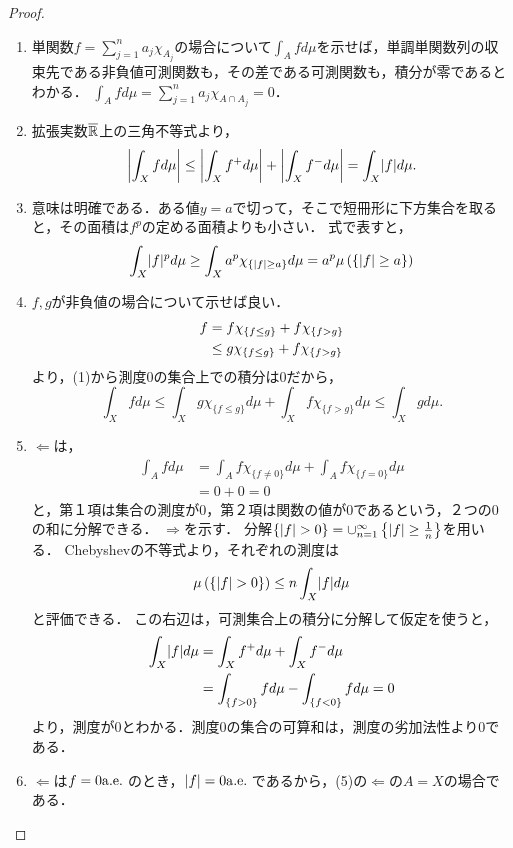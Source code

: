 \documentclass[uplatex, dvipdfmx]{jsreport}
\begin{document}
\begin{proof}\mbox{}
    \begin{enumerate}
        \item 単関数$f=\sum^n_{j=1}a_j\chi_{A_j}$の場合について$\int_Afd\mu$を示せば，単調単関数列の収束先である非負値可測関数も，その差である可測関数も，積分が零であるとわかる．
        $\int_Afd\mu=\sum^n_{j=1}a_j\chi_{A\cap A_j}=0$．
        \item 
        拡張実数$\overline{\mathbb{R}}$上の三角不等式より，
        \[\left|\int_Xfd\mu\right|\le\left|\int_Xf^+d\mu\right|+\left|\int_Xf^-d\mu\right|=\int_X\lvert f\rvert d\mu.\]
        \item 意味は明確である．ある値$y=a$で切って，そこで短冊形に下方集合を取ると，その面積は$f^p$の定める面積よりも小さい．
        式で表すと，
        \[\int_X\lvert f\rvert^pd\mu\ge\int_Xa^p\chi_{\{\lvert f\rvert\ge a\}}d\mu=a^p\mu\left(\left\{\lvert f\rvert\ge a\right\}\right)\]
        \item $f,g$が非負値の場合について示せば良い．
        \begin{align*}
            f&=f\chi_{\left\{f\le g\right\}}+f\chi_{\left\{f>g\right\}}\\
            &\le g\chi_{\left\{f\le g\right\}}+f\chi_{\left\{f>g\right\}}
        \end{align*}
        より，(1)から測度$0$の集合上での積分は$0$だから，
        \[\int_Xfd\mu\le\int_Xg\chi_{\{f\le g\}}d\mu+\int_Xf\chi_{\{f>g\}}d\mu\le\int_Xgd\mu.\]
        \item $\Leftarrow$は，
        \begin{align*}
            \int_Afd\mu&=\int_Af\chi_{\{f\ne 0\}}d\mu+\int_Af\chi_{\{f=0\}}d\mu\\
            &=0+0=0
        \end{align*}
        と，第１項は集合の測度が$0$，第２項は関数の値が$0$であるという，２つの$0$の和に分解できる．
        $\Rightarrow$を示す．
        分解$\left\{\lvert f\rvert>0\right\}=\cup^\infty_{n=1}\left\{\lvert f\rvert\ge\frac{1}{n}\right\}$を用いる．
        Chebyshevの不等式より，それぞれの測度は
        \[\mu\left(\left\{\lvert f\rvert>0\right\}\right)\le n\int_X\lvert f\rvert d\mu\]
        と評価できる．
        この右辺は，可測集合上の積分に分解して仮定を使うと，
        \begin{align*}
            \int_X\lvert f\rvert d\mu&=\int_Xf^+d\mu+\int_Xf^-d\mu\\
            &=\int_{\{f>0\}}fd\mu-\int_{\{f<0\}}fd\mu=0
        \end{align*}
        より，測度が$0$とわかる．測度$0$の集合の可算和は，測度の劣加法性より$0$である．
        \item 
        $\Leftarrow$は$f=0\mathrm{a.e.}\;$のとき，$\lvert f\rvert=0\mathrm{a.e.}\;$であるから，(5)の$\Leftarrow$の$A=X$の場合である．

\end{enumerate}
\end{proof}
\end{document}
